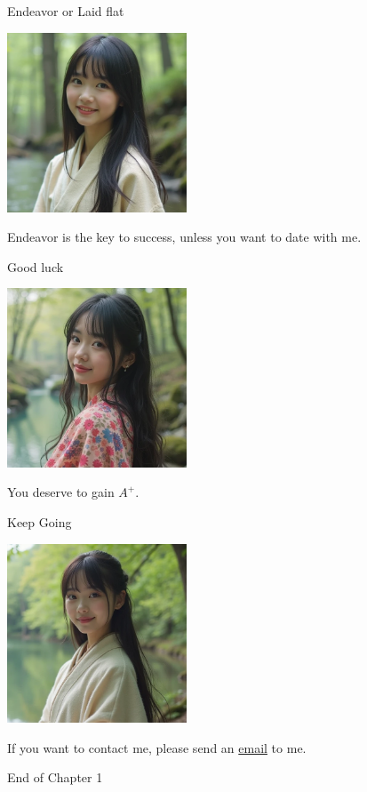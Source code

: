\documentclass{beamer}
\begin{document}
\begin{frame}{Endeavor or Laid flat}
\begin{center}
\includegraphics[width=0.4\textwidth]{fail.png}
\end{center}
\begin{center}
Endeavor is the key to success, unless you want to date with me.
\end{center}
\end{frame}
\begin{frame}{Good luck}
\begin{center}
\includegraphics[width=0.4\textwidth]{good_luck.png}
\end{center}
\begin{center}
You deserve to gain $A^+$.
\end{center}
\end{frame}
\begin{frame}{Keep Going}
\begin{center}
\includegraphics[width=0.4\textwidth]{kg.png}
\end{center}
\begin{center}
If you want to contact me, please send an \href{mailto:politics-tchsiao@gmail.com}{email} to me.
\end{center}
\end{frame}
\begin{frame}{}
\begin{center}
\Large{End of Chapter 1}
\end{center}
\end{frame}
\end{document}

